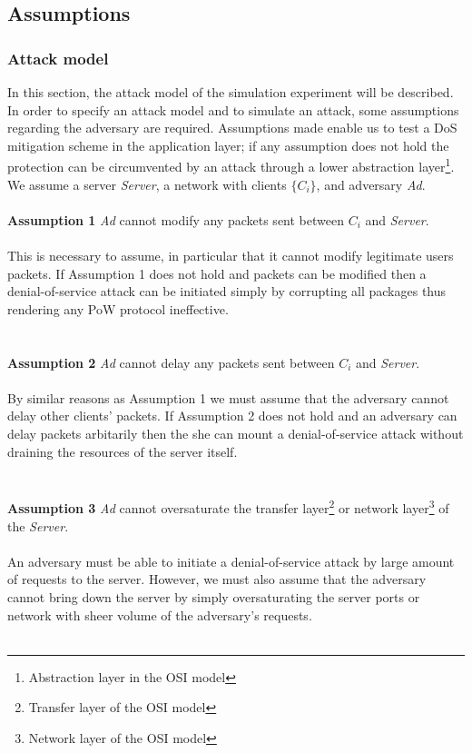 \subsection{Assumptions}
\subsubsection{Attack model}
In this section, the attack model of the simulation experiment will be described.
In order to specify an attack model and to simulate an attack, some assumptions regarding the adversary are required.
Assumptions made enable us to test a DoS mitigation scheme in the application layer; if any assumption does not hold the protection can be circumvented by an attack through a lower abstraction layer\footnote{Abstraction layer in the OSI model}. 
We assume a server \emph{Server}, a network with clients \emph{$\{C_i\}$}, and adversary \emph{Ad}.
\\
\\
\noindent \textbf{Assumption 1} \indent \emph{Ad} cannot modify any packets sent between \emph{$C_i$} and \emph{Server}.
\\
\\
This is necessary to assume, in particular that it cannot modify legitimate users packets. If Assumption 1 does not hold and packets can be modified then a denial-of-service attack can be initiated simply by corrupting all packages thus rendering any PoW protocol ineffective.
\\
\\
\\
\noindent \textbf{Assumption 2} \indent \emph{Ad} cannot delay any packets sent between \emph{$C_i$} and \emph{Server}.
\\
\\
By similar reasons as Assumption 1 we must assume that the adversary cannot delay other clients' packets. If Assumption 2 does not hold and an adversary can delay packets arbitarily then the she can mount a denial-of-service attack without draining the resources of the server itself.
\\
\\
\\
\noindent \textbf{Assumption 3} \indent \emph{Ad} cannot oversaturate the transfer layer\footnote{Transfer layer of the OSI model} or network layer\footnote{Network layer of the OSI model} of the \emph{Server}.
\\
\\
An adversary must be able to initiate a denial-of-service attack by large amount of requests to the server. However, we must also assume that the adversary cannot bring down the server by simply oversaturating the server ports or network with sheer volume of the adversary's requests.
\\
\\
